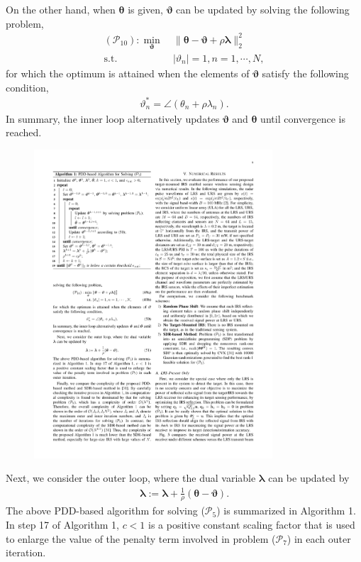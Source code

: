 \documentclass[10pt,final,doublecolumn]{IEEEtran}
\begin{document}
On the other hand, when $\boldsymbol{\theta}$ is given, $\boldsymbol{\vartheta}$ can be updated by solving the following problem,
\begin{subequations}
\begin{align}
(\mathcal{P}_{10}): \mathop{\min}\limits_{\boldsymbol{\vartheta}}&~ \|\boldsymbol{\theta}-\boldsymbol{\vartheta} +\rho\boldsymbol{\lambda}\|_2^2 \label{OP8}\\
\text {s.t.}&~|{\vartheta}_n|= 1, n=1,\cdots,N, \label{cdd3}
\end{align}
\end{subequations}
for which the optimum is attained when the elements of $\boldsymbol{\vartheta}$ satisfy the following condition,
\begin{align}\label{vn}
{\vartheta}_n^*=\angle({\theta}_n+\rho{\lambda}_n).
\end{align}
In summary, the inner loop alternatively updates $\boldsymbol{\vartheta}$ and $\boldsymbol{\theta}$ until convergence is reached.
\begin{figure}[t]
\centering
\setlength{\abovecaptionskip}{0.cm}
\includegraphics[width=3.5in]{jie.pdf}
\label{alg:admm}
\end{figure}

Next, we consider the outer loop, where the dual variable $\boldsymbol{\lambda}$ can be updated by
\begin{align}
\boldsymbol{\lambda}:=\boldsymbol{\lambda}+\frac{1}{\rho}(\boldsymbol{\theta}-\boldsymbol{\vartheta}). \label{OP8}
\end{align}
The above PDD-based algorithm  for solving ($\mathcal{P}_5$) is summarized in Algorithm 1. In step 17 of Algorithm 1, $c < 1$ is a positive constant scaling factor that is used to enlarge the value of the penalty term involved in problem ($\mathcal{P}_7$) in each outer iteration.
\end{document}
